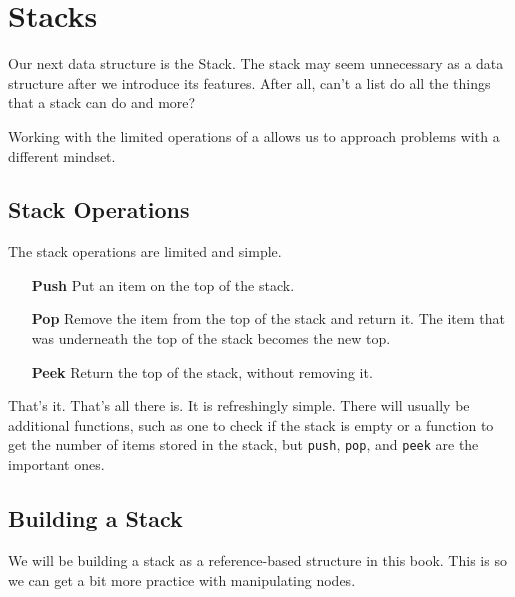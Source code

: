 \chapter{Stacks}
Our next data structure is the Stack.
The stack may seem unnecessary as a data structure after we introduce its features.  
After all, can't a list do all the things that a stack can do and more? 

Working with the limited operations of a allows us to approach problems with a different mindset.

\section{Stack Operations}

The stack operations are limited and simple. 

\begin{enumerate}
	\item[\textbf{Push}] Put an item on the top of the stack.
	\item[\textbf{Pop}] Remove the item from the top of the stack and return it.  The item that was underneath the top of the stack becomes the new top.
	\item[\textbf{Peek}] Return the top of the stack, without removing it.
\end{enumerate}


That's it.  That's all there is.  It is refreshingly simple.
There will usually be additional functions, such as one to check if the stack is empty or a function to get the number of items stored in the stack, but \texttt{push}, \texttt{pop}, and \texttt{peek} are the important ones.




\section{Building a Stack}

We will be building a stack as a reference-based structure in this book.  This is so we can get a bit more practice with manipulating nodes.


	

